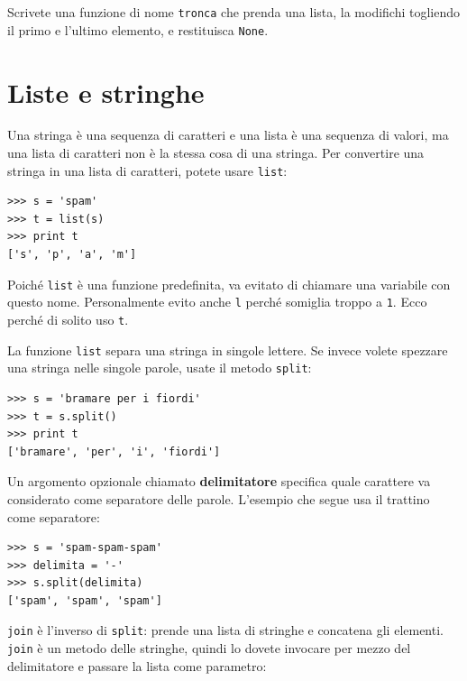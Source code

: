 \documentclass[10pt]{book}
\begin{document}
\vspace{0.2in}
\begin{exercise}

Scrivete una funzione di nome \verb"tronca" che prenda una lista, la modifichi togliendo il primo e l'ultimo elemento, e restituisca {\tt None}.

\end{exercise}


\section{Liste e stringhe}

Una stringa è una sequenza di caratteri e una lista è una sequenza di valori, ma una lista di caratteri non è la stessa cosa di una stringa. Per convertire una stringa in una lista di caratteri, potete usare {\tt list}:

\begin{verbatim}
>>> s = 'spam'
>>> t = list(s)
>>> print t
['s', 'p', 'a', 'm']
\end{verbatim}
%
Poiché {\tt list} è una funzione predefinita, va evitato di chiamare una variabile con questo nome. Personalmente evito anche {\tt l} perché somiglia troppo a {\tt 1}.  Ecco perché di solito uso {\tt t}.

La funzione {\tt list} separa una stringa in singole lettere. Se invece volete spezzare una stringa nelle singole parole, usate il metodo {\tt split}:

\begin{verbatim}
>>> s = 'bramare per i fiordi'
>>> t = s.split()
>>> print t
['bramare', 'per', 'i', 'fiordi']
\end{verbatim}
%
Un argomento opzionale chiamato {\bf delimitatore} specifica quale carattere va considerato come separatore delle parole. L'esempio che segue usa il trattino come separatore:

\begin{verbatim}
>>> s = 'spam-spam-spam'
>>> delimita = '-'
>>> s.split(delimita)
['spam', 'spam', 'spam']
\end{verbatim}
%
{\tt join} è l'inverso di {\tt split}: prende una lista di stringhe e concatena gli elementi.  {\tt join} è un metodo delle stringhe, quindi lo dovete invocare per mezzo del delimitatore e passare la lista come parametro:
\end{document}
